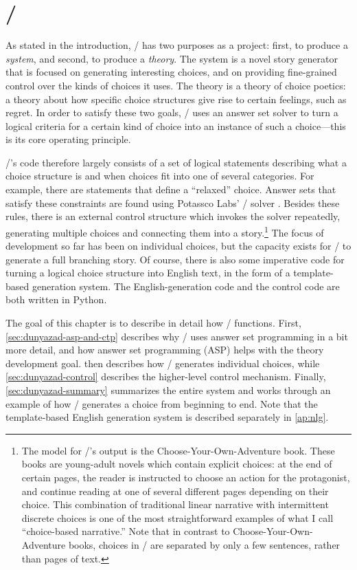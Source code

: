 \chapter{\dunyazad/}

\label{ch:dunyazad}%

As stated in the introduction, \dunyazad/ has two purposes as a project: first, to produce a \emph{system}, and second, to produce a \emph{theory}.
%
The system is a novel story generator that is focused on generating interesting choices, and on providing fine-grained control over the kinds of choices it uses.
%
The theory is a theory of choice poetics: a theory about how specific choice structures give rise to certain feelings, such as regret.
%
In order to satisfy these two goals, \dunyazad/ uses an answer set solver to turn a logical criteria for a certain kind of choice into an instance of such a choice---this is its core operating principle.


\dunyazad/'s code therefore largely consists of a set of logical statements describing what a choice structure is and when choices fit into one of several categories.
%
For example, there are statements that define a ``relaxed'' choice.
%
Answer sets that satisfy these constraints are found using Potassco Labs' \clingo/ solver \citep{Gebser2011}.
%
Besides these rules, there is an external control structure which invokes the solver repeatedly, generating multiple choices and connecting them into a story.\footnote{
The model for \dunyazad/'s output is the Choose-Your-Own-Adventure book.
%
These books are young-adult novels which contain explicit choices: at the end of certain pages, the reader is instructed to choose an action for the protagonist, and continue reading at one of several different pages depending on their choice.
%
This combination of traditional linear narrative with intermittent discrete choices is one of the most straightforward examples of what I call ``choice-based narrative.''
%
Note that in contrast to Choose-Your-Own-Adventure books, choices in \dunyazad/ are separated by only a few sentences, rather than pages of text.}
%
The focus of development so far has been on individual choices, but the capacity exists for \dunyazad/ to generate a full branching story.
%
Of course, there is also some imperative code for turning a logical choice structure into English text, in the form of a template-based generation system.
%
The English-generation code and the control code are both written in Python.


The goal of this chapter is to describe in detail how \dunyazad/ functions.
%
First, \cref{sec:dunyazad-asp-and-ctp} describes why \dunyazad/ uses answer set programming in a bit more detail, and how answer set programming (ASP) helps with the theory development goal.
%
 then describes how \dunyazad/ generates individual choices, while \cref{sec:dunyazad-control} describes the higher-level control mechanism.
%
Finally, \cref{sec:dunyazad-summary} summarizes the entire system and works through an example of how \dunyazad/ generates a choice from beginning to end.
%
Note that the template-based English generation system is described separately in \cref{ap:nlg}.

